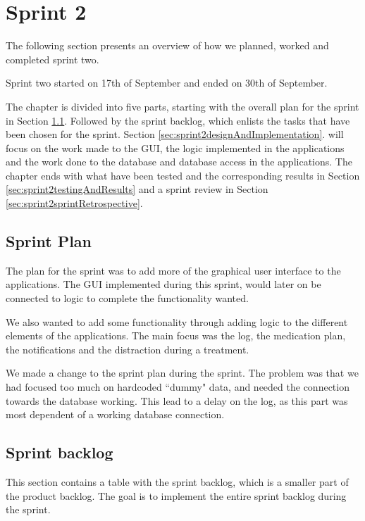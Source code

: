 \chapter{Sprint 2}
\label{chap:sprint2}
The following section presents an overview of how we planned, worked and
completed sprint two.

Sprint two started on 17th of September and ended on 30th of September.

The chapter is divided into five parts, starting with the overall plan for the
sprint in Section \ref{sec:sprint2sprintplan}. Followed by the sprint backlog, which
enlists the tasks that have been chosen for the sprint. Section
\ref{sec:sprint2designAndImplementation}.
will focus on the work made to the GUI, the logic implemented in the applications 
and the work done to the database and database access in the applications.
The chapter ends with what have been tested and the corresponding results in
Section \ref{sec:sprint2testingAndResults} and a sprint review in Section
\ref{sec:sprint2sprintRetrospective}.

\section{Sprint Plan}
\label{sec:sprint2sprintplan}
The plan for the sprint was to add more of the graphical user interface to the applications.
The GUI implemented during this sprint, would later on be connected to logic to complete the functionality wanted.


We also wanted to add some functionality through adding logic to the different elements of the applications. The main focus was the log, the medication plan, the notifications and the distraction during a treatment. 


We made a change to the sprint plan during the sprint. The problem was that we
had focused too much on hardcoded ``dummy" data, and needed the connection towards
the database working. This lead to a delay on the log, as this part was most
dependent of a working database connection.


\section{Sprint backlog}
This section contains a table with the sprint backlog, which is a smaller part of the product 
backlog. The goal is to implement the entire sprint backlog during the sprint.

